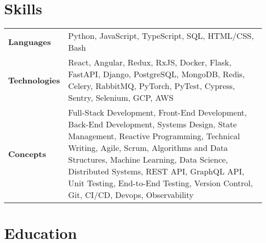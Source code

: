 \documentclass{ethan_cv}
\begin{document}
\section{Skills}
    \small
     \begin{tabular}{p{2.25cm} p{16cm}}
         \textbf{Languages} & Python, JavaScript, TypeScript, SQL, HTML/CSS, Bash \\ 
         \textbf{Technologies} & React, Angular, Redux, RxJS, Docker, Flask, FastAPI, Django, PostgreSQL, MongoDB, Redis, Celery, RabbitMQ, PyTorch, PyTest, Cypress, Sentry, Selenium, GCP, AWS \\
         \textbf{Concepts} & Full-Stack Development, Front-End Development, Back-End Development, Systems Design, State Management, Reactive Programming, Technical Writing, Agile, Scrum, Algorithms and Data Structures, Machine Learning, Data Science, Distributed Systems, REST API, GraphQL API, Unit Testing, End-to-End Testing, Version Control, Git, CI/CD, Devops, Observability
     \end{tabular}
     \vspace{+3mm}


\section{Education}
\end{document}
